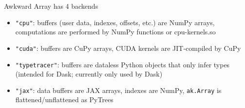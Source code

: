 \documentclass[aspectratio=169]{beamer}
\begin{document}
\begin{frame}{Awkward Array has 4 backends}
\large
\vspace{0.5 cm}
\begin{itemize}\setlength{\itemsep}{0.5 cm}
\item<1-> \texttt{"cpu"}: buffers (user data, indexes, offsets, etc.) are NumPy arrays, computations are performed by NumPy functions or cpu-kernels.so
\item<2-> \texttt{"cuda"}: buffers are CuPy arrays, CUDA kernels are JIT-compiled by CuPy
\item<3-> \texttt{"typetracer"}: buffers are dataless Python objects that only infer types (intended for Dask; currently only used by Dask)
\item<4-> \texttt{"jax"}: data buffers are JAX arrays, indexes are NumPy, \texttt{ak.Array} is flattened/unflattened as PyTrees
\end{itemize}

\vspace{0.5 cm}
\end{frame}
\end{document}

